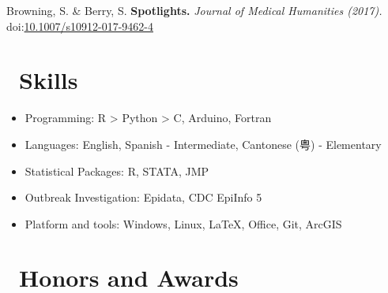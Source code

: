 \documentclass{resume}
\begin{document}
Browning, S. \& Berry, S. \textbf{Spotlights.} \textit{Journal of Medical Humanities (2017).} \\
doi:\href{http://link.springer.com/article/10.1007/s10912-017-9462-4}{10.1007/s10912-017-9462-4}

 
\section{\faCogs\ Skills}
\begin{itemize}[parsep=0.5ex]
  \item Programming: R > Python > C, Arduino, Fortran
  \item Languages: English, Spanish - Intermediate, Cantonese (粤) - Elementary
  \item Statistical Packages: R, STATA, JMP
  \item Outbreak Investigation: Epidata, CDC EpiInfo 5
  \item Platform and tools: Windows, Linux, \LaTeX, Office, Git, ArcGIS
\end{itemize}

\section{\faStarO\ Honors and Awards}



%
%
\end{document}
